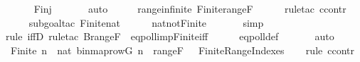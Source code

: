 \begin{isabellebody}
\ \ \ \ \isamarkupfalse%
\ Finj\ \isanewline
\ \ \ \ \isamarkupfalse%
\ auto\isanewline
\ \ \isamarkupfalse%
\ \isamarkupfalse%
\ rangeinfinite{\isacharcolon}{\kern0pt}\ {\isachardoublequoteopen}{\isasymnot}Finite{\isacharparenleft}{\kern0pt}range{\isacharparenleft}{\kern0pt}F{\isacharparenright}{\kern0pt}{\isacharparenright}{\kern0pt}{\isachardoublequoteclose}\ \isanewline
\ \ \ \ \isamarkupfalse%
{\isacharparenleft}{\kern0pt}rule{\isacharunderscore}{\kern0pt}tac\ ccontr{\isacharparenright}{\kern0pt}\isanewline
\ \ \ \ \isamarkupfalse%
{\isacharparenleft}{\kern0pt}subgoal{\isacharunderscore}{\kern0pt}tac\ {\isachardoublequoteopen}Finite{\isacharparenleft}{\kern0pt}nat{\isacharparenright}{\kern0pt}{\isachardoublequoteclose}{\isacharparenright}{\kern0pt}\isanewline
\ \ \ \ \isamarkupfalse%
\ nat{\isacharunderscore}{\kern0pt}not{\isacharunderscore}{\kern0pt}Finite\isanewline
\ \ \ \ \ \isamarkupfalse%
\ simp\isanewline
\ \ \ \ \isamarkupfalse%
{\isacharparenleft}{\kern0pt}rule\ iffD{}{\isacharcomma}{\kern0pt}\ rule{\isacharunderscore}{\kern0pt}tac\ B{\isacharequal}{\kern0pt}{\isachardoublequoteopen}range{\isacharparenleft}{\kern0pt}F{\isacharparenright}{\kern0pt}{\isachardoublequoteclose}\ \ eqpoll{\isacharunderscore}{\kern0pt}imp{\isacharunderscore}{\kern0pt}Finite{\isacharunderscore}{\kern0pt}iff{\isacharparenright}{\kern0pt}\isanewline
\ \ \ \ \isamarkupfalse%
\ eqpoll{\isacharunderscore}{\kern0pt}def\ \isanewline
\ \ \ \ \isamarkupfalse%
\ auto\isanewline
\ \ \isamarkupfalse%
\ {\isachardoublequoteopen}{\isasymnot}Finite{\isacharparenleft}{\kern0pt}{\isacharbraceleft}{\kern0pt}\ n\ {\isasymin}\ nat{\isachardot}{\kern0pt}\ binmap{\isacharunderscore}{\kern0pt}row{\isacharparenleft}{\kern0pt}G{\isacharcomma}{\kern0pt}\ n{\isacharparenright}{\kern0pt}\ {\isasymin}\ range{\isacharparenleft}{\kern0pt}F{\isacharparenright}{\kern0pt}\ {\isacharbraceright}{\kern0pt}{\isacharparenright}{\kern0pt}{\isachardoublequoteclose}\ {\isacharparenleft}{\kern0pt}\ {\isachardoublequoteopen}{\isasymnot}Finite{\isacharparenleft}{\kern0pt}{\isacharquery}{\kern0pt}RangeIndexes{\isacharparenright}{\kern0pt}{\isachardoublequoteclose}{\isacharparenright}{\kern0pt}\isanewline
\ \ \isamarkupfalse%
\ {\isacharparenleft}{\kern0pt}rule\ ccontr{\isacharparenright}{\kern0pt}\isanewline
\ \ \ \ \isamarkupfalse%

\end{isabellebody}
